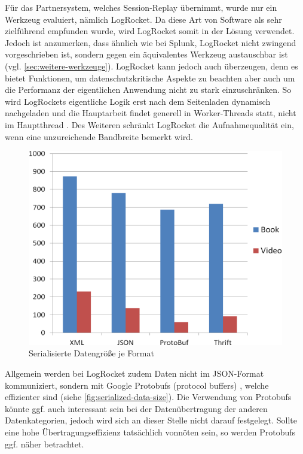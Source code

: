	Für das Partnersystem, welches Session-Replay übernimmt, wurde nur ein Werkzeug evaluiert, nämlich LogRocket. Da diese Art von Software als sehr zielführend empfunden wurde, wird LogRocket somit in der Lösung verwendet. Jedoch ist anzumerken, dass ähnlich wie bei Splunk, LogRocket nicht zwingend vorgeschrieben ist, sondern gegen ein äquivalentes Werkzeug austauschbar ist (vgl. \autoref{sec:weitere-werkzeuge}). LogRocket kann jedoch auch überzeugen, denn es bietet Funktionen, um datenschutzkritische Aspekte zu beachten aber auch um die Performanz der eigentlichen Anwendung nicht zu stark einzuschränken. So wird LogRockets eigentliche Logik erst nach dem Seitenladen dynamisch nachgeladen und die Hauptarbeit findet generell in Worker-Threads statt, nicht im Hauptthread \cite{LogRocketPerformance}. Des Weiteren schränkt LogRocket die Aufnahmequalität ein, wenn eine unzureichende Bandbreite bemerkt wird.

\begin{figure}
\centering
\includegraphics[width=\linewidth]{img/04_erstellung-poc/ComparisonDataSerializationFormats_figure4.png}
\caption{Serialisierte Datengröße je Format \cite{ComparisonDataSerializationFormats}}
\label{fig:serialized-data-size}
\end{figure}
	
	Allgemein werden bei LogRocket zudem Daten nicht im JSON-Format kommuniziert, sondern mit Google Protobufs (protocol buffers) \cite{GoogleProtobufs}, welche effizienter sind (siehe \autoref{fig:serialized-data-size}). Die Verwendung von Protobufs könnte ggf. auch interessant sein bei der Datenübertragung der anderen Datenkategorien, jedoch wird sich an dieser Stelle nicht darauf festgelegt. Sollte eine hohe Übertragungseffizienz tatsächlich vonnöten sein, so werden Protobufs ggf. näher betrachtet.

